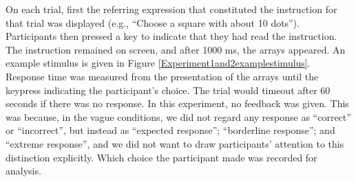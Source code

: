 On each trial, first the referring expression that constituted the instruction for that trial was displayed (e.g., ``Choose a square with about 10 dots''). Participants then pressed a key to indicate that they had read the instruction. The instruction remained on screen, and after 1000 ms, the arrays appeared. An example stimulus is given in Figure \ref{Experiment1and2examplestimulus}. Response time was measured from the presentation of the arrays until the keypress indicating the participant's choice. The trial would timeout after 60 seconds if there was no response. In this experiment, no feedback was given. This was because, in the vague conditions, we did not regard any response as ``correct'' or ``incorrect'', but instead as ``expected response''; ``borderline response''; and ``extreme response'', and we did not want to draw participants' attention to this distinction explicitly. Which choice the participant made was recorded for analysis.

